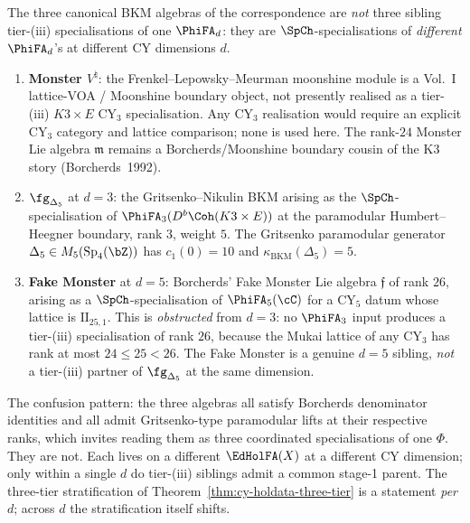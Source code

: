 \begin{remark}
\label{rem:cy-holdata-bkm-dim-strat}
The three canonical BKM algebras of the correspondence are \emph{not} three
sibling tier-(iii) specialisations of one $\PhiFA_d$: they are
$\SpCh$-specialisations of \emph{different} $\PhiFA_d$'s at different
CY dimensions $d$.
\begin{enumerate}[label=\textup{(\roman*)},leftmargin=2.4em]
\item \textbf{Monster $V^\natural$}: the Frenkel--Lepowsky--Meurman
moonshine module is a Vol.~I lattice-VOA / Moonshine boundary object,
not presently realised as a tier-(iii) \(K3\times E\) CY$_3$
specialisation. Any CY$_3$ realisation would require an explicit CY$_3$
category and lattice comparison; none is used here. The rank-$24$
Monster Lie algebra \(\mathfrak m\) remains a Borcherds/Moonshine
boundary cousin of the K3 story (Borcherds~1992).
\item \textbf{$\fg_{\Delta_5}$} at $d = 3$: the Gritsenko--Nikulin BKM
arising as the $\SpCh$-specialisation of $\PhiFA_3(D^b\Coh(K3 \times E))$
at the paramodular Humbert--Heegner boundary, rank $3$, weight $5$.
The Gritsenko paramodular generator $\Delta_5 \in M_5(\mathrm{Sp}_4(\bZ))$
has $c_1(0) = 10$ and $\kappa_{\mathrm{BKM}}(\Delta_5) = 5$.
\item \textbf{Fake Monster} at $d = 5$: Borcherds' Fake Monster Lie algebra
$\mathfrak{f}$ of rank $26$, arising as a $\SpCh$-specialisation of
$\PhiFA_5(\cC)$ for a CY$_5$ datum whose lattice is $\mathrm{II}_{25,1}$.
This is \emph{obstructed} from $d = 3$: no $\PhiFA_3$ input produces
a tier-(iii) specialisation of rank $26$, because the Mukai lattice of
any CY$_3$ has rank at most $24 \leq 25 < 26$. The Fake Monster is a
genuine $d = 5$ sibling, \emph{not} a tier-(iii) partner of
$\fg_{\Delta_5}$ at the same dimension.
\end{enumerate}
The confusion pattern: the three algebras all satisfy Borcherds
denominator identities and all admit Gritsenko-type paramodular lifts at
their respective ranks, which invites reading them as three coordinated
specialisations of one $\Phi$. They are not. Each lives on a different
$\EdHolFA(X)$ at a different CY dimension; only within a single $d$ do
tier-(iii) siblings admit a common stage-1 parent. The three-tier
stratification of Theorem~\ref{thm:cy-holdata-three-tier} is a
statement \emph{per $d$}; across $d$ the stratification itself shifts.
\end{remark}

